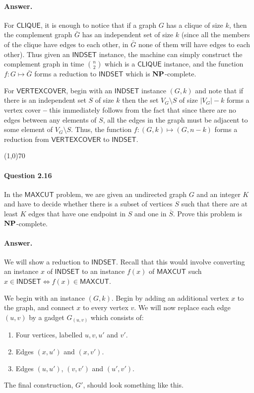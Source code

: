 \paragraph{Answer.} For $\mathsf{CLIQUE}$, it is enough to notice that if a graph $G$ has a clique of size $k$, then the complement graph $\bar{G}$ has an independent set of size $k$ (since all the members of the clique have edges to each other, in $\bar{G}$ none of them will have edges to each other). Thus given an $\mathsf{INDSET}$ instance, the machine can simply construct the complement graph in time $\binom{n}{2}$ which is a $\mathsf{CLIQUE}$ instance, and the function $f:G\mapsto\bar{G}$ forms a reduction to $\mathsf{INDSET}$ which is $\mathbf{NP}$-complete.

For $\mathsf{VERTEXCOVER}$, begin with an $\mathsf{INDSET}$ instance $(G,k)$ and note that if there is an independent set $S$ of size $k$ then the set $V_G\setminus S$ of size $|V_{G}|-k$ forms a vertex cover \textbf{--} this immediately follows from the fact that since there are no edges between any elements of $S$, all the edges in the graph must be adjacent to some element of $V_G\setminus S$. Thus, the function $f:(G,k)\mapsto(G,n-k)$ forms a reduction from $\mathsf{VERTEXCOVER}$ to $\mathsf{INDSET}$.

\begin{center}
	\line(1,0){70}
\end{center}

\paragraph{Question 2.16} In the $\mathsf{MAXCUT}$ problem, we are given an undirected graph $G$ and an integer $K$ and have to decide whether there is a subset of vertices $S$ such that there are at least $K$ edges that have one endpoint in $S$ and one in $\bar{S}$. Prove this problem is $\mathbf{NP}$-complete.

\paragraph{Answer.} We will show a reduction to $\mathsf{INDSET}$. Recall that this would involve converting an instance $x$ of $\mathsf{INDSET}$ to an instance $f(x)$ of $\mathsf{MAXCUT}$ such $x\in\mathsf{INDSET}\iff f(x)\in\mathsf{MAXCUT}$.

We begin with an instance $(G,k)$. Begin by adding an additional vertex $x$ to the graph, and connect $x$ to every vertex $v$. We will now replace each edge $(u,v)$ by a gadget $G_{(u,v)}$ which consists of:
\begin{enumerate}
	\item Four vertices, labelled $u,v, u'$ and $v'$.
	\item Edges $(x, u')$ and $(x,v')$.
	\item Edges $(u, u')$, $(v,v')$ and $(u',v')$.
\end{enumerate}
The final construction, $G'$, should look something like this. 

